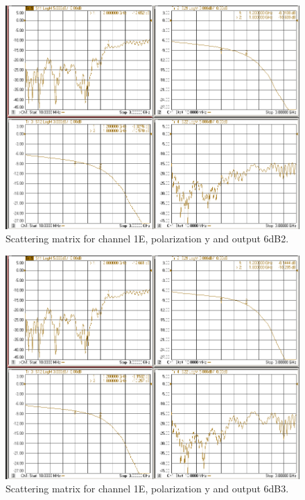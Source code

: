 \documentclass[12pt,a4paper,oneside]{article}
\begin{document}
\begin{figure}[H]
\centering
\includegraphics[width=0.9\linewidth]{VNA_results/1Ey_6dB2.png}
\caption{Scattering matrix for channel 1E, polarization y and output 6dB2.}
\label{fig:1Ey_6dB2}
\end{figure}


\begin{figure}[H]
\centering
\includegraphics[width=0.9\linewidth]{VNA_results/1Ey_6dB3.png}
\caption{Scattering matrix for channel 1E, polarization y and output 6dB3.}
\label{fig:1Ey_6dB3}
\end{figure}
\end{document}
